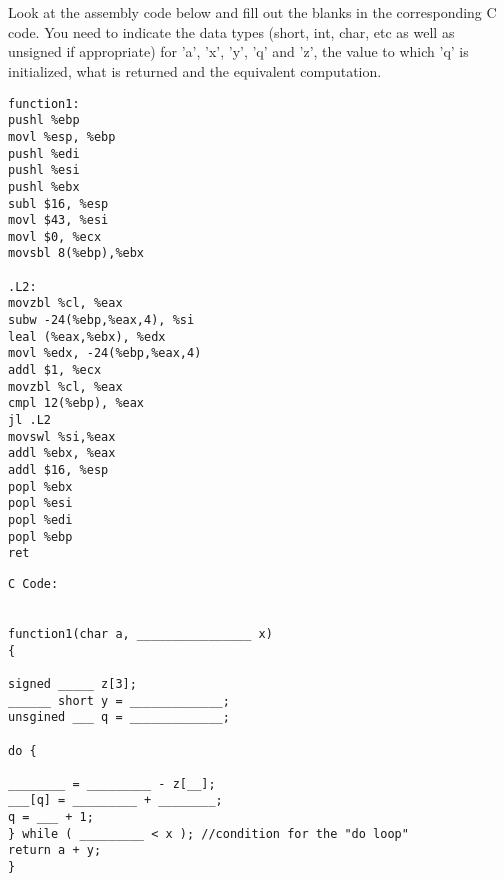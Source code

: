\documentclass[a4paper]{article}
\begin{document}
	
	\section{}
	Look at the assembly code below and fill out the blanks in the corresponding C code. 
	You need to indicate the data types (short, int, char, etc as well as unsigned if appropriate) 
	for ’a’, ’x’, ’y’, ’q’ and ’z’, the value to which ’q’ is initialized, what is returned and 
	the equivalent computation.
	\begin{lstlisting}
function1:
pushl %ebp
movl %esp, %ebp
pushl %edi
pushl %esi
pushl %ebx
subl $16, %esp
movl $43, %esi
movl $0, %ecx
movsbl 8(%ebp),%ebx

.L2:
movzbl %cl, %eax
subw -24(%ebp,%eax,4), %si
leal (%eax,%ebx), %edx
movl %edx, -24(%ebp,%eax,4)
addl $1, %ecx
movzbl %cl, %eax
cmpl 12(%ebp), %eax
jl .L2
movswl %si,%eax
addl %ebx, %eax
addl $16, %esp
popl %ebx
popl %esi
popl %edi
popl %ebp
ret
	\end{lstlisting}
	\newpage
	\begin{lstlisting}
C Code:


function1(char a, ________________ x)
{

signed _____ z[3];
______ short y = _____________;
unsgined ___ q = _____________;

do {

________ = _________ - z[__];
___[q] = _________ + ________;
q = ___ + 1;
} while ( _________ < x ); //condition for the "do loop"
return a + y;
}
	\end{lstlisting}
	
	
	
	
\end{document}
